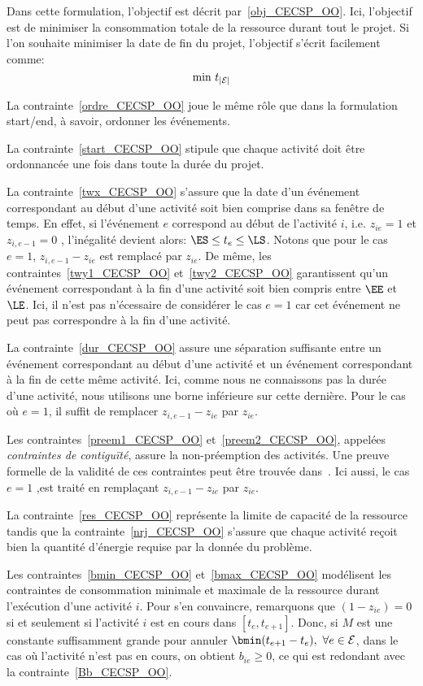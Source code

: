 Dans cette formulation, l'objectif est décrit
par~\eqref{obj_CECSP_OO}. Ici, l'objectif est de minimiser la
consommation totale de la ressource durant tout le projet. Si 
l'on souhaite minimiser la date de fin du projet, l'objectif s'écrit 
facilement comme: 
\begin{equation}
\text{min } t_{|{\cal E}|} \notag
\end{equation} 

La contrainte~\eqref{ordre_CECSP_OO} joue le même rôle que dans la
formulation start/end, à savoir, ordonner les événements.

La contrainte~\eqref{start_CECSP_OO} stipule que chaque activité doit
être ordonnancée une fois dans toute la durée du projet.
 
La contrainte~\eqref{twx_CECSP_OO} s'assure que la date d'un événement
correspondant au début d'une activité soit bien comprise dans sa
fenêtre de temps.  En effet, si l'événement $e$ correspond au début de
l'activité $i$, i.e. $z_{ie}=1$ et $z_{i,e-1}=0$ , l'inégalité devient
alors: $\ES \le t_e \le \LS$. Notons que pour le cas $e=1$,
$z_{i,e-1}-z_{ie}$ est remplacé par $z_{ie}$. De même, les
contraintes~\eqref{twy1_CECSP_OO} et~\eqref{twy2_CECSP_OO}
garantissent qu'un événement correspondant à la fin d'une activité
soit bien compris entre $\EE$ et $\LE$. Ici, il n'est pas
n'écessaire de considérer le cas $e=1$ car cet événement ne peut pas
correspondre à la fin d'une activité. 

La contrainte~\eqref{dur_CECSP_OO} assure une séparation suffisante
entre un événement correspondant au début d'une activité et un
événement correspondant à la fin de cette même activité. Ici, comme
nous ne connaissons pas la durée d'une activité, nous utilisons une
borne inférieure sur cette dernière. Pour le cas où $e=1$, il suffit
de remplacer $z_{i,e-1}-z_{ie}$ par $z_{ie}$.

Les contraintes~\eqref{preem1_CECSP_OO} et~\eqref{preem2_CECSP_OO},
appelées {\it contraintes de contiguïté}, assure la non-préemption des
activités. Une preuve formelle de la validité de ces contraintes peut
être trouvée dans~\cite{modele_RCPSP}. Ici aussi, le cas $e=1$ ,est
traité en remplaçant $z_{i,e-1}-z_{ie}$ par $z_{ie}$.

La contrainte~\eqref{res_CECSP_OO} représente la limite de capacité de
la ressource tandis que la contrainte~\eqref{nrj_CECSP_OO} s'assure
que chaque activité reçoit bien la quantité d'énergie requise par la
donnée du problème.

Les contraintes~\eqref{bmin_CECSP_OO} et~\eqref{bmax_CECSP_OO}
modélisent les contraintes de consommation minimale et maximale de la
ressource durant l'exécution d'une activité $i$. Pour s'en convaincre,
remarquons que $(1-z_{ie})=0$ si et seulement si l'activité $i$ est en
cours dans $[t_e,t_{e+1}]$. Donc, si $M$ est une constante
suffisamment grande pour annuler $\bmin(t_{e+1}-t_e),\ \forall e \in
\E$, dans le cas où l'activité n'est pas en cours, on obtient
$b_{ie} \ge 0$, ce qui est redondant avec la
contrainte~\eqref{Bb_CECSP_OO}.

